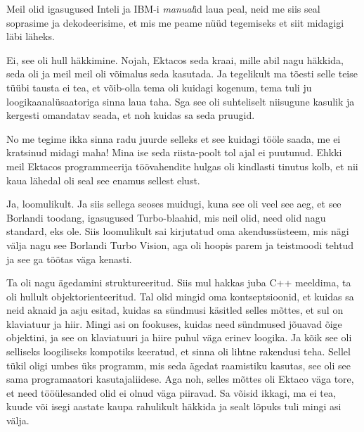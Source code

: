 Meil olid igasugused Inteli ja IBM-i \emph{manual}id laua peal, neid me siis 
seal soprasime ja dekodeerisime, et mis me peame nüüd tegemiseks et siit 
midagigi läbi läheks. 



Ei, see oli hull häkkimine. Nojah, Ektacos seda kraai, mille abil nagu häkkida, 
seda oli ja meil meil oli võimalus seda kasutada. Ja tegelikult ma tõesti selle 
teise tüübi  tausta ei tea, et võib-olla tema oli  kuidagi kogenum, tema tuli 
ju loogikaanalüsaatoriga sinna laua taha. Sga see oli suhteliselt niisugune 
kasulik ja kergesti omandatav seada, et noh kuidas sa seda pruugid. 


No me tegime ikka sinna radu juurde selleks et see kuidagi tööle saada, me ei 
kratsinud midagi maha! Mina ise seda riista-poolt tol ajal ei puutunud. Ehkki 
meil Ektacos programmeerija töövahendite hulgas oli kindlasti tinutus kolb, et 
nii kaua lähedal oli seal see enamus sellest elust. 



Ja, loomulikult. Ja siis sellega seoses muidugi, kuna  see oli veel see aeg, et 
 see Borlandi 
toodang, igasugused Turbo-blaahid, mis neil olid, need olid nagu  standard, eks 
ole. Siis loomulikult sai kirjutatud oma akendussüsteem, mis nägi välja nagu 
see Borlandi Turbo Vision, aga oli hoopis parem ja teistmoodi tehtud ja see ga töötas väga 
kenasti. 


Ta oli nagu ägedamini struktureeritud. Siis mul hakkas juba 
C++  meeldima, ta oli hullult objektorienteeritud. Tal olid 
mingid oma kontseptsioonid, et kuidas sa neid aknaid ja asju  esitad, kuidas sa 
sündmusi käsitled  selles mõttes, et sul on klaviatuur ja hiir. Mingi asi on 
fookuses, kuidas need sündmused jõuavad õige objektini, ja see on  klaviatuuri 
ja hiire puhul väga erinev loogika. Ja kõik see oli selliseks loogiliseks 
kompotiks keeratud, et sinna oli lihtne rakendusi teha. Sellel tükil oligi 
umbes üks programm, mis  seda ägedat raamistiku kasutas, see oli see sama 
programaatori kasutajaliidese. Aga noh, selles mõttes oli Ektaco väga tore, et 
need tööülesanded olid ei olnud väga piiravad. Sa võisid ikkagi, ma ei tea, 
kuude või isegi aastate kaupa rahulikult häkkida ja sealt lõpuks tuli mingi asi 
välja. 

